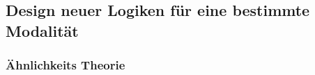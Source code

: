 
\subsection{Design neuer Logiken für eine bestimmte Modalität} %
\label{sub:design_neuer_logiken_fuer_eine_bestimmte_modalitaet}

\subsubsection{Ähnlichkeits Theorie}



